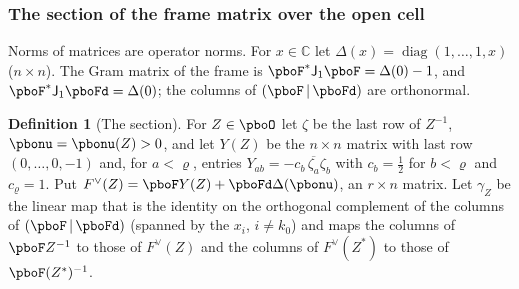 \documentclass[10pt]{amsart}
\theoremstyle{definition}
\newtheorem{definition}[theorem]{Definition}
\theoremstyle{remark}
\newcommand{\C}{\mathbb C}
\providecommand{\aubar}[1]{\overline{#1}}
\begin{document}
\subsubsection{The section of the frame matrix over the open cell}\label{pbo:ss-section}

Norms of matrices are operator norms. For $x\in\C$ let $\Delta(x)=\operatorname{diag}(1,\dots,1,x)$
($n\times n$). The Gram matrix of the frame is $\pboF^*\mathsf J_1\pboF=\Delta(0)-1$, and
$\pboF^*\mathsf J_1\pboFd=\Delta(0)$; the columns of $(\pboF\,|\,\pboFd)$ are orthonormal.

\begin{definition}[The section]\label{pbo:def-section}
For $Z\in\pboO$ let $\zeta$ be the last row of $Z^{-1}$, $\pbonu=\pbonu(Z)>0$, and let $Y(Z)$ be the
$n\times n$ matrix with last row $(0,\dots,0,-1)$ and, for $a<\varrho$, entries $Y_{ab}=-c_b\,\aubar{
\zeta_a}\zeta_b$ with $c_b=\frac12$ for $b<\varrho$ and $c_\varrho=1$. Put $F^\vee(Z)=\pboF Y(Z)+\pboFd
\Delta(\pbonu)$, an $r\times n$ matrix. Let $\gamma_Z$ be the linear map that is the identity on the
orthogonal complement of the columns of $(\pboF\,|\,\pboFd)$ (spanned by the $x_i$, $i\ne k_0$) and
maps the columns of $\pboF Z^{-1}$ to those of $F^\vee(Z)$ and the columns of $F^\vee(Z^*)$ to those
of $\pboF(Z^*)^{-1}$.
\end{definition}
\end{document}
